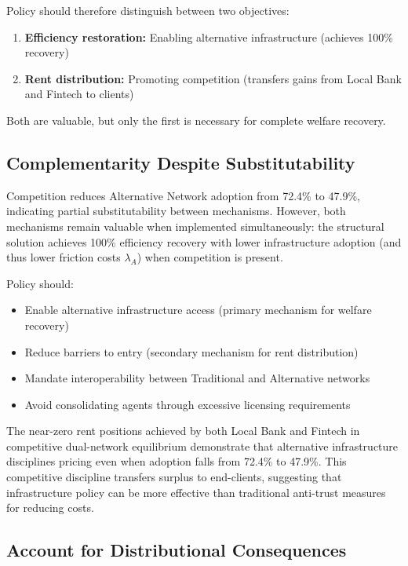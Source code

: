 Policy should therefore distinguish between two objectives:
\begin{enumerate}
    \item \textbf{Efficiency restoration:} Enabling alternative infrastructure (achieves 100\% recovery)
    \item \textbf{Rent distribution:} Promoting competition (transfers gains from Local Bank and Fintech to clients)
\end{enumerate}

Both are valuable, but only the first is necessary for complete welfare recovery.

\subsection{Complementarity Despite Substitutability}

Competition reduces Alternative Network adoption from 72.4\% to 47.9\%, indicating partial substitutability between mechanisms. However, both mechanisms remain valuable when implemented simultaneously: the structural solution achieves 100\% efficiency recovery with lower infrastructure adoption (and thus lower friction costs $\lambda_A$) when competition is present.

Policy should:
\begin{itemize}
    \item Enable alternative infrastructure access (primary mechanism for welfare recovery)
    \item Reduce barriers to entry (secondary mechanism for rent distribution)
    \item Mandate interoperability between Traditional and Alternative networks
    \item Avoid consolidating agents through excessive licensing requirements
\end{itemize}

The near-zero rent positions achieved by both Local Bank and Fintech in competitive dual-network equilibrium demonstrate that alternative infrastructure disciplines pricing even when adoption falls from 72.4\% to 47.9\%. This competitive discipline transfers surplus to end-clients, suggesting that infrastructure policy can be more effective than traditional anti-trust measures for reducing costs.

\subsection{Account for Distributional Consequences}

